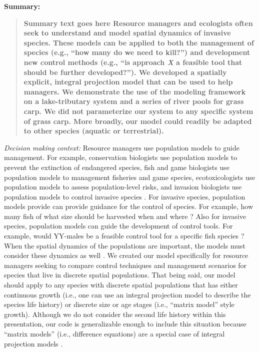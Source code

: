 \documentclass{article}[12pt]
\begin{document}
\textbf{Summary:}
\begin{verse}
\textbf{ Summary text goes here
Resource managers and ecologists often seek to understand and model spatial dynamics of invasive species.
These models can be applied to both the management of species (e.g., ``how many do we need to kill?'') and development new control methods (e.g., ``is approach \textit{X} a feasible tool that should be further developed?''). 
We developed a spatially explicit, integral projection model that can be used to help managers. 
We demonstrate the use of the modeling framework on a lake-tributary system and a series of river pools for grass carp.
We did not parameterize our system to any specific system of grass carp.
More broadly, our model could readily be adapted to other species (aquatic or terrestrial). 
}
\end{verse}

\textit{Decision making context:}
Resource managers use population models to guide management.
For example, conservation biologists use population models to prevent the extinction of endangered species, fish and game biologists use population models to management fisheries and game species, ecotoxicologists use population models to assess population-level risks, and  invasion biologists use population models to control invasive species \citep{morris2002quantitative}.
For invasive species, population models provide can provide guidance for the control of species.
For example, how many fish of what size should be harvested when and where \citep[e.g.,][]{tsehaye2013prospects}?
Also for invasive species, population models can guide the development of control tools.
For example, would YY-males be a feasible control tool for a specific fish species \citep[e.g.,][]{Erickson:2017ecomod, schill2017simulated}?
When the spatial dynamics of the populations are important, the models must consider these dynamics as well \citep{strasser2012contributions}. 
We created our model specifically for resource managers seeking to compare control techniques and management scenarios for species that live in discrete spatial populations. 
That being said, our model should apply to any species with discrete spatial populations that has either continuous growth (i.e., one can use an integral projection model to describe the species life history) or discrete size or age stages (i.e., ``matrix model'' style growth). 
Although we do not consider the second life history within this presentation, our code is generalizable enough to include this situation because ``matrix models'' (i.e., difference equations) are a special case of integral projection models \citep{Ellner:2010IPM}.
\end{document}
